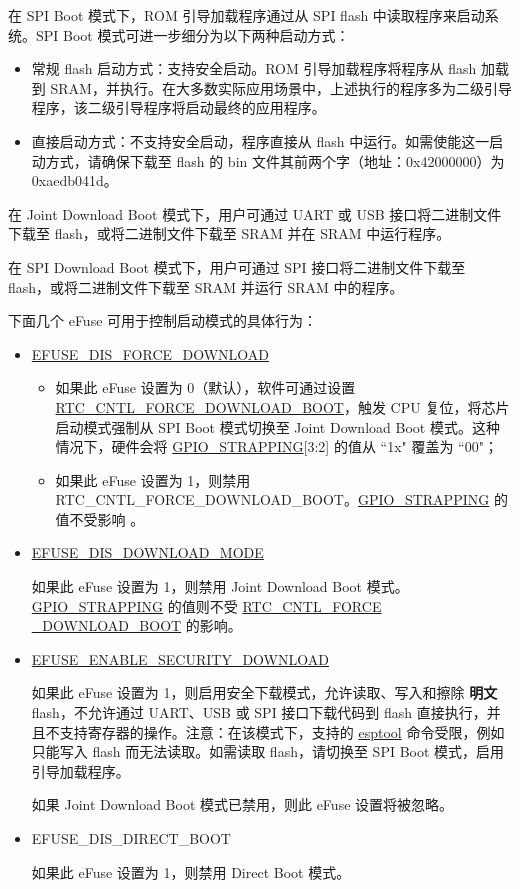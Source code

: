 \documentclass[main\_\_CN.tex]{subfiles}
\begin{document}
在 SPI Boot 模式下，ROM 引导加载程序通过从 SPI flash 中读取程序来启动系统。SPI Boot 模式可进一步细分为以下两种启动方式：
\begin{itemize}
    \item 常规 flash 启动方式：支持安全启动。ROM 引导加载程序将程序从 flash 加载到 SRAM，并执行。在大多数实际应用场景中，上述执行的程序多为二级引导程序，该二级引导程序将启动最终的应用程序。
    \item 直接启动方式：不支持安全启动，程序直接从 flash 中运行。如需使能这一启动方式，请确保下载至 flash 的 bin 文件其前两个字（地址：0x{}42000000）为 0x{}aedb041d。
\end{itemize}

在 Joint Download Boot 模式下，用户可通过 UART 或 USB 接口将二进制文件下载至 flash，或将二进制文件下载至 SRAM 并在 SRAM 中运行程序。

在 SPI Download Boot 模式下，用户可通过 SPI 接口将二进制文件下载至 flash，或将二进制文件下载至 SRAM 并运行 SRAM 中的程序。

下面几个 eFuse 可用于控制启动模式的具体行为：

\begin{itemize}
    \item \hyperref[fielddesc:EFUSEDISFORCEDOWNLOAD]{EFUSE\_DIS\_FORCE\_DOWNLOAD}
    \begin{itemize}
    \item 如果此 eFuse 设置为 0（默认），软件可通过设置 \hyperref[fielddesc:RTCCNTLFORCEDOWNLOADBOOT]{RTC\_CNTL\_FORCE\_DOWNLOAD\_BOOT}，触发 CPU 复位，将芯片启动模式强制从 SPI Boot 模式切换至 Joint Download Boot 模式。这种情况下，硬件会将 \hyperref[fielddesc:GPIOSTRAPPING]{GPIO\_STRAPPING}[3:2] 的值从 ``1x" 覆盖为 ``00"；
    \item 如果此 eFuse 设置为 1，则禁用 RTC\_CNTL\_FORCE\_DOWNLOAD\_BOOT。\hyperref[fielddesc:GPIOSTRAPPING]{GPIO\_STRAPPING} 的值不受影响 。
    \end{itemize}
    \item \hyperref[fielddesc:EFUSEDISDOWNLOADMODE]{EFUSE\_DIS\_DOWNLOAD\_MODE}

    如果此 eFuse 设置为 1，则禁用 Joint Download Boot 模式。\hyperref[fielddesc:GPIOSTRAPPING]{GPIO\_STRAPPING} 的值则不受 \hyperref[fielddesc:RTCCNTLFORCEDOWNLOADBOOT]{RTC\_CNTL\_FORCE\\\_DOWNLOAD\_BOOT} 的影响。
    \item \hyperref[fielddesc:EFUSEENABLESECURITYDOWNLOAD]{EFUSE\_ENABLE\_SECURITY\_DOWNLOAD}

    如果此 eFuse 设置为 1，则启用安全下载模式，允许读取、写入和擦除 \textbf{明文} flash，不允许通过 UART、USB 或 SPI 接口下载代码到 flash 直接执行，并且不支持寄存器的操作。注意：在该模式下，支持的 \href{https://docs.espressif.com/projects/esptool/en/latest/esp32s3/esptool/index.html}{esptool} 命令受限，例如只能写入 flash 而无法读取。如需读取 flash，请切换至 SPI Boot 模式，启用引导加载程序。

    如果 Joint Download Boot 模式已禁用，则此 eFuse 设置将被忽略。

    \item EFUSE\_DIS\_DIRECT\_BOOT

    如果此 eFuse 设置为 1，则禁用 Direct Boot 模式。
\end{itemize}
\end{document}
